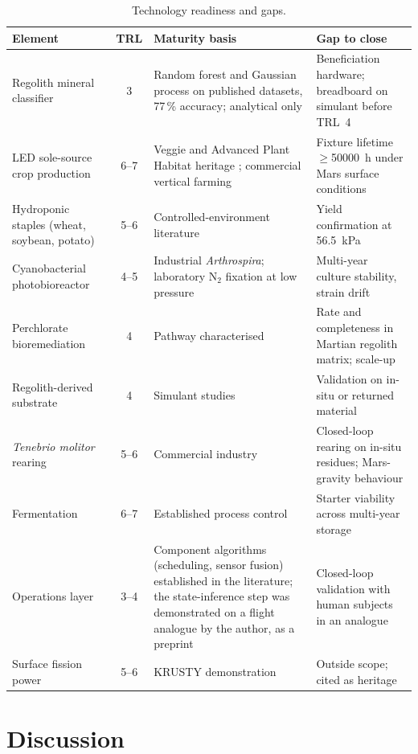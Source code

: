 \documentclass[11pt,a4paper,3p,authoryear]{elsarticle}
\begin{document}
\begin{table}[t]
\centering\small
\caption{Technology readiness and gaps.}
\label{tab:trl}
\begin{tabular}{@{}p{3.2cm}cp{4.6cm}p{5.2cm}@{}}
\toprule
Element & TRL & Maturity basis & Gap to close \\
\midrule
Regolith mineral classifier & 3 & Random forest and Gaussian process on published datasets, 77\,\% accuracy; analytical only & Beneficiation hardware; breadboard on simulant before TRL~4 \\
LED sole-source crop production & 6--7 & Veggie and Advanced Plant Habitat heritage \citep{Massa2017veggie}; commercial vertical farming & Fixture lifetime $\geq$\SI{50000}{\hour} under Mars surface conditions \\
Hydroponic staples (wheat, soybean, potato) & 5--6 & Controlled-environment literature \citep{Wheeler2008productivity} & Yield confirmation at \SI{56.5}{\kilo\pascal} \\
Cyanobacterial photobioreactor & 4--5 & Industrial \emph{Arthrospira}; laboratory N$_2$ fixation at low pressure \citep{Verseux2021cyano} & Multi-year culture stability, strain drift \\
Perchlorate bioremediation & 4 & Pathway characterised \citep{Melnyk2011perchlorate} & Rate and completeness in Martian regolith matrix; scale-up \\
Regolith-derived substrate & 4 & Simulant studies \citep{Duri2022regolith} & Validation on in-situ or returned material \\
\emph{Tenebrio molitor} rearing & 5--6 & Commercial industry \citep{vanHuis2013insects} & Closed-loop rearing on in-situ residues; Mars-gravity behaviour \\
Fermentation & 6--7 & Established process control & Starter viability across multi-year storage \\
Operations layer & 3--4 & Component algorithms (scheduling, sensor fusion) established in the literature; the state-inference step was demonstrated on a flight analogue by the author, as a preprint \citep{PuertaAngulo2026hrp} & Closed-loop validation with human subjects in an analogue \\
Surface fission power & 5--6 & KRUSTY demonstration & Outside scope; cited as heritage \\
\bottomrule
\end{tabular}
\end{table}

\section{Discussion}\label{sec:discussion}
\end{document}
